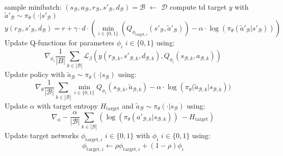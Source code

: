 \begin{algorithm}
\begin{algorithmic}
        \State{} sample minibatch: $(s_\mathcal{B}, a_\mathcal{B}, r_\mathcal{B}, s'_\mathcal{B}, d_\mathcal{B}) = \mathcal{B}$ $\leftarrow$ $\mathcal{D}$ 
        \State{} compute td target $y$ with $\tilde{a}'_\mathcal{B} \sim \pi_\theta(\cdot|s'_\mathcal{B})$
        \begin{equation}\label{eqn:td-target-batch}
            y(r_\mathcal{B}, s'_\mathcal{B}, d_\mathcal{B}) = r + \gamma \cdot d \cdot \left(\min_{i\in\{0, 1\}}\left(Q_{\phi_{\text{target}, i}}(s'_\mathcal{B}, \tilde{a}'_\mathcal{B})\right) - \alpha \cdot \log\left(\pi_\theta(\tilde{a}'_\mathcal{B}|s'_\mathcal{B})\right)\right)
        \end{equation}
        \State{} Update Q-functions for parameters $\phi_i$ $i \in \{0, 1\}$ using:
        \begin{equation}\label{eqn:q-update}
            \nabla_{\phi_i} \frac{1}{|B|} \sum_{k \in |\mathcal{B}|}\mathcal{L}_\beta\left(y(r_{\mathcal{B}, k}, s'_{\mathcal{B}, k}, d_{\mathcal{B}, k}), Q_{\phi_i}(s_{\mathcal{B}, k}, a_{\mathcal{B}, k})\right)    
        \end{equation}
        \State{} Update policy with $\tilde{a}_\mathcal{B} \sim \pi_\theta(\cdot|s_\mathcal{B})$ using:
        \begin{equation}\label{eqn:policy-update}
           \nabla_{\theta} \frac{1}{|\mathcal{B}|}\sum_{k \in |\mathcal{B}|}\min_{i\in\{0, 1\}}Q_{\phi_i}(s_{\mathcal{B}, k}, \tilde{a}_{\mathcal{B}, k}) - \alpha \cdot \log\left(\pi_\theta(\tilde{a}_{\mathcal{B}, k}|s_{\mathcal{B}, k}\right))
        \end{equation}
        \State{} Update $\alpha$ with target entropy $H_\text{target}$ and $\tilde{a}_\mathcal{B} \sim \pi_\theta(\cdot|s_\mathcal{B})$ using:
        \begin{equation*}
            \nabla_\alpha -\frac{\alpha}{|\mathcal{B}|} \sum_{k \in |\mathcal{B}|} \left(\log\left(\pi_\theta(a'_{\mathcal{B}, k}|s_{\mathcal{B}, k})\right)\ - H_\text{target}\right)
        \end{equation*}
        \State{} Update target networks $\phi_{\text{target}, i}$ $i \in \{0, 1\}$ with $\phi_i$ $i \in \{0, 1\}$ using:
        \begin{equation*}
            \phi_{\text{target}, i} \leftarrow \rho \phi_{\text{target}, i} + (1 - \rho) \phi_i
        \end{equation*}
        \EndFor{}
        \EndIf{}
        \EndFor{}
\end{algorithmic}
\end{algorithm}